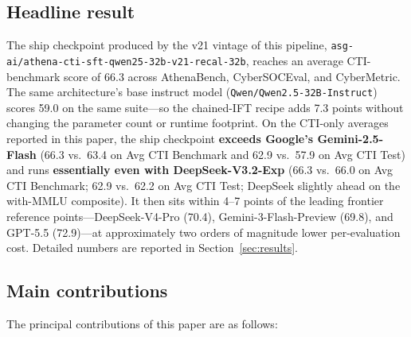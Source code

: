 \documentclass[webpdf,contemporary,large]{oup-authoring-template}
\providecommand{\hfid}[1]{{\small\nolinkurl{#1}}}
\theoremstyle{thmstyleone}
\theoremstyle{thmstyletwo}
\theoremstyle{thmstylethree}
\begin{document}
\subsection{Headline result}
\label{sec:intro-headline-result}
The ship checkpoint produced by the v21 vintage of this pipeline, \hfid{asg-ai/athena-cti-sft-qwen25-32b-v21-recal-32b}, reaches an average CTI-benchmark score of 66.3 across AthenaBench, CyberSOCEval, and CyberMetric. The same architecture's base instruct model (\hfid{Qwen/Qwen2.5-32B-Instruct}) scores 59.0 on the same suite---so the chained-IFT recipe adds 7.3 points without changing the parameter count or runtime footprint. On the CTI-only averages reported in this paper, the ship checkpoint \textbf{exceeds Google's Gemini-2.5-Flash} (66.3 vs.\ 63.4 on Avg CTI Benchmark and 62.9 vs.\ 57.9 on Avg CTI Test) and runs \textbf{essentially even with DeepSeek-V3.2-Exp} (66.3 vs.\ 66.0 on Avg CTI Benchmark; 62.9 vs.\ 62.2 on Avg CTI Test; DeepSeek slightly ahead on the with-MMLU composite). It then sits within 4--7 points of the leading frontier reference points---DeepSeek-V4-Pro (70.4), Gemini-3-Flash-Preview (69.8), and GPT-5.5 (72.9)---at approximately two orders of magnitude lower per-evaluation cost. Detailed numbers are reported in Section~\ref{sec:results}.

\subsection{Main contributions}
\label{sec:intro-main-contributions}
The principal contributions of this paper are as follows:
\end{document}
